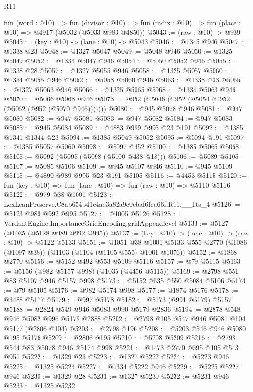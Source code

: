 \begin{lexlean}{R11}
\begin{coremodule}
  fun (word : @10) =>
  fun (divisor : @10) => fun (radix : @10) => fun (place : @10) => @4917 (@5032 (@5033 @983 @4850))
@5043 := (raw : @10) -> @939
@5045 := (key : @10) -> (lane : @10) -> @5043
@5046 := @1345 @946
@5047 := @1338 @23
@5048 := @1327 @5047
@5049 := @5048 @946
@5050 := @1325 @5049
@5052 := @1334 @5047 @946
@5054 := @5050 @5052 @946
@5055 := @1338 @28
@5057 := @1327 @5055 @946
@5058 := @1325 @5057
@5060 := @1334 @5055 @946
@5062 := @5058 @5060 @946
@5063 := @1338 @33
@5065 := @1327 @5063 @946
@5066 := @1325 @5065
@5068 := @1334 @5063 @946
@5070 := @5066 @5068 @946
@5078 := @952 (@5046 (@952 (@5054 (@952 (@5062 (@952 (@5070 @946)))))))
@5080 := @945 @5078 @946
@5081 := @947 @5080
@5082 := @947 @5081
@5083 := @947 @5082
@5084 := @947 @5083
@5085 := @945 @5084
@5089 := @4883 @989 @995 @23 @191
@5092 := @1385 @1341 @1344 @23
@5094 := @1385 @5049 @5052
@5095 := @5094 @191
@5097 := @1385 @5057 @5060
@5098 := @5097 @452
@5100 := @1385 @5065 @5068
@5105 := @5092 (@5095 (@5098 (@5100 @438 @18)))
@5106 := @5089 @5105
@5107 := @5085 @5106
@5109 := @945 @5107 @946
@5110 := @945 @5109
@5115 := @4890 @989 @995 @23 @191 @5105
@5116 := @4453 @5115
@5120 := fun (key : @10) => fun (lane : @10) => fun (raw : @10) => @5110 @5116
@5122 := @979 @38 @1001
@5123 := LexLeanPreserve.C8ab654b41c4ae3a82a9c0ebaf6fcd66f.R11.__fits_4
@5126 := @5123 @989 @992 @995
@5127 := @1005 @5126
@5128 := VerdantEngine.ImportanceGridEncoding.gridAppendlevel
@5133 := @5127 (@1035 (@5128 @989 @992 @995))
@5137 := (key : @10) -> (lane : @10) -> (raw : @10) -> @5122 @5133
@5151 := @1051
    @38
    @1001
    @5133
    @555
    @2770
    (@1086 (@1097 @38))
    (@1103 (@1104 (@1105 @555) @1001 @1076))
@5152 := @1868 @2770
@5156 := @5152 @492 @553 @5109 @5116
@5157 := @79 @5115
@5163 := @5156 (@982 @5157 @998) (@1035 (@4456 @5115))
@5169 := @2798 @551 @83 @5107 @946 @5157 @998
@5173 := @5152 @535 @550 @5084 @5106
@5174 := @79 @5105
@5176 := @982 @5174 @998
@5177 := @1874 @5176
@5178 := @3488 @5177
@5179 := @997 @5178
@5182 := @5173 (@991 @5179) @5157
@5188 := @2824 @549 @946 @5083 @990 @5179 @2836
@5194 := @2878 @548 @946 @5082 @996 @5178 @2888
@5202 := @2798 @105 @547 @946 @5081 @104 @5177 (@2806 @104)
@5203 := @2798 @196
@5208 := @5203 @546 @946 @5080 @195 @5176
@5209 := @2806 @195
@5210 := @5208 @5209
@5216 := @2798 @544 @83 @5078 @946 @5174 @998
@5221 := @1473 @2770 @395 @105 @543 @951
@5222 := @1329 @23
@5223 := @1327 @5222
@5224 := @5223 @946
@5225 := @1325 @5224
@5227 := @1334 @5222 @946
@5229 := @5225 @5227 @946
@5230 := @1329 @28
@5231 := @1327 @5230
@5232 := @5231 @946
@5233 := @1325 @5232

\end{coremodule}
\end{lexlean}
